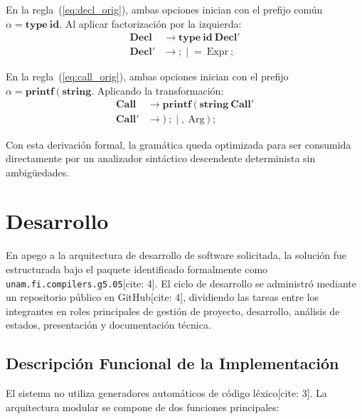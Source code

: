 \documentclass[letterpaper,12pt,oneside]{article}
\begin{document}
En la regla~(\ref{eq:decl_orig}), ambas opciones inician con el prefijo común $\alpha = \mathbf{type} \ \mathbf{id}$. Al aplicar factorización por la izquierda:
\begin{align}
    \mathbf{Decl} &\to \mathbf{type} \ \mathbf{id} \ \mathbf{Decl'} \\
    \mathbf{Decl'} &\to \mathbf{;} \;\Big|\; \mathbf{=} \ \text{Expr} \ \mathbf{;}
\end{align}

En la regla~(\ref{eq:call_orig}), ambas opciones inician con el prefijo $\alpha = \mathbf{printf} \ \mathbf{(} \ \mathbf{string}$. Aplicando la transformación:
\begin{align}
    \mathbf{Call} &\to \mathbf{printf} \ \mathbf{(} \ \mathbf{string} \ \mathbf{Call'} \\
    \mathbf{Call'} &\to \mathbf{)} \ \mathbf{;} \;\Big|\; \mathbf{,} \ \text{Arg} \ \mathbf{)} \ \mathbf{;}
\end{align}

Con esta derivación formal, la gramática queda optimizada para ser consumida directamente por un analizador sintáctico descendente determinista sin ambigüedades.

\section{Desarrollo}

En apego a la arquitectura de desarrollo de software solicitada, la solución fue estructurada bajo el paquete identificado formalmente como \texttt{unam.fi.compilers.g5.05}[cite: 4]. El ciclo de desarrollo se administró mediante un repositorio público en GitHub[cite: 4], dividiendo las tareas entre los integrantes en roles principales de gestión de proyecto, desarrollo, análisis de estados, presentación y documentación técnica.

\subsection{Descripción Funcional de la Implementación}
El sistema no utiliza generadores automáticos de código léxico[cite: 3]. La arquitectura modular se compone de dos funciones principales:
\end{document}
